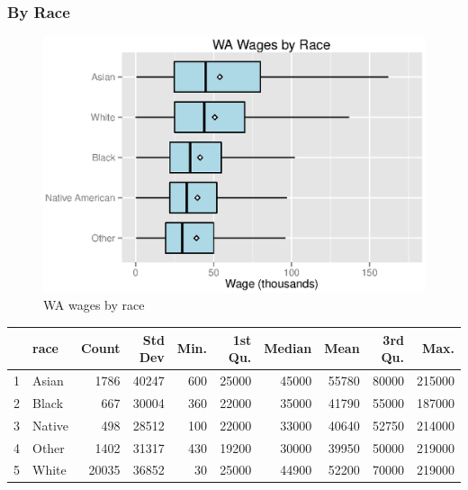 \documentclass{exam}
\begin{document}
  \subsubsection{By Race}
  \begin{figure}[H]
    \centering
    \includegraphics{figures/wa_wage_by_race.eps}
    \caption{WA wages by race}
  \end{figure}

  \begin{table}[ht]
    \centering
    \begin{tabular}{rlrrrrrrrr}
      \toprule
          & race   & Count & Std Dev & Min. & 1st Qu. & Median & Mean  & 3rd Qu. & Max. \\
      \midrule
        1 & Asian  & 1786  & 40247   & 600  & 25000   & 45000  & 55780 & 80000   & 215000 \\
        2 & Black  & 667   & 30004   & 360  & 22000   & 35000  & 41790 & 55000   & 187000 \\
        3 & Native & 498   & 28512   & 100  & 22000   & 33000  & 40640 & 52750   & 214000 \\
        4 & Other  & 1402  & 31317   & 430  & 19200   & 30000  & 39950 & 50000   & 219000 \\
        5 & White  & 20035 & 36852   & 30   & 25000   & 44900  & 52200 & 70000   & 219000 \\
      \bottomrule
    \end{tabular}
  \end{table}
\end{document}
